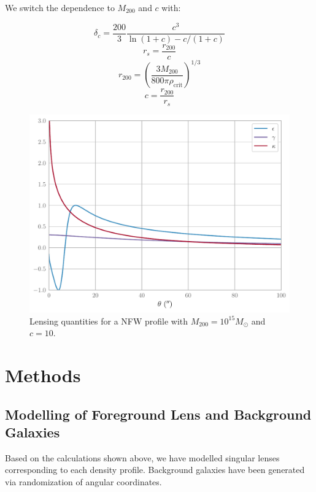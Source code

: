 \documentclass[10pt]{article}
\begin{document}
We switch the dependence to $M_{200}$ and $c$ with:

\begin{equation}
\delta_c = \frac{200}{3} \frac{c^3}{\ln(1 + c) - c/(1 + c)}
\end{equation}
\begin{equation}
r_s = \frac{r_{200}}{c}
\end{equation}
\begin{equation}
r_{200} = \left( \frac{3 M_{200}}{800 \pi \rho_\mathrm{crit}} \right)^{1/3}
\end{equation}
\begin{equation}
c = \frac{r_{200}}{r_s}
\end{equation}

\begin{figure}
    \includegraphics{nfwproperties.pdf}
    \caption{Lensing quantities for a NFW profile with $M_{200} = 10^{15} M_\odot$ and $c = 10$.}
    \label{}
\end{figure}




\section{Methods}

\subsection{Modelling of Foreground Lens and Background Galaxies}
Based on the calculations shown above, we have modelled singular lenses corresponding to each density profile.
 Background galaxies have been generated via randomization of angular coordinates.
\end{document}
